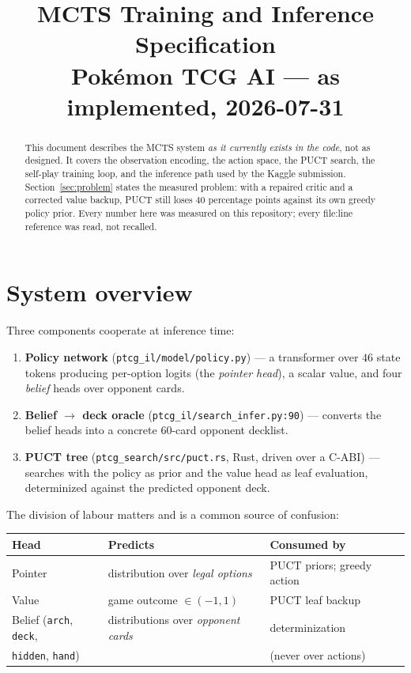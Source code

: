 \documentclass[11pt,a4paper]{article}
\title{\textbf{MCTS Training and Inference Specification}\\[0.3em]
\large Pok\'emon TCG AI --- as implemented, 2026-07-31}
\author{}
\date{}
\newcommand{\code}[1]{\texttt{\small #1}}
\newcommand{\file}[1]{\texttt{\small #1}}
\begin{document}
\maketitle

\begin{abstract}
\noindent
This document describes the MCTS system \emph{as it currently exists in the
code}, not as designed. It covers the observation encoding, the action space,
the PUCT search, the self-play training loop, and the inference path used by
the Kaggle submission. Section~\ref{sec:problem} states the measured problem:
with a repaired critic and a corrected value backup, PUCT still loses
$40$ percentage points against its own greedy policy prior. Every number here
was measured on this repository; every file:line reference was read, not
recalled.
\end{abstract}

\tableofcontents

\section{System overview}

Three components cooperate at inference time:

\begin{enumerate}[leftmargin=*]
  \item \textbf{Policy network} (\file{ptcg\_il/model/policy.py}) --- a
    transformer over $46$ state tokens producing per-option logits (the
    \emph{pointer head}), a scalar value, and four \emph{belief} heads over
    opponent cards.
  \item \textbf{Belief $\to$ deck oracle}
    (\file{ptcg\_il/search\_infer.py:90}) --- converts the belief heads into a
    concrete $60$-card opponent decklist.
  \item \textbf{PUCT tree} (\file{ptcg\_search/src/puct.rs}, Rust, driven over
    a C-ABI) --- searches with the policy as prior and the value head as leaf
    evaluation, determinized against the predicted opponent deck.
\end{enumerate}

\noindent
The division of labour matters and is a common source of confusion:

\begin{center}
\begin{tabular}{@{}lll@{}}
\toprule
\textbf{Head} & \textbf{Predicts} & \textbf{Consumed by} \\
\midrule
Pointer & distribution over \emph{legal options} & PUCT priors; greedy action \\
Value   & game outcome $\in(-1,1)$              & PUCT leaf backup \\
Belief (\code{arch}, \code{deck}, & distributions over \emph{opponent cards} & determinization \\
\quad \code{hidden}, \code{hand}) & & (never over actions) \\
\bottomrule
\end{tabular}
\end{center}
\end{document}
